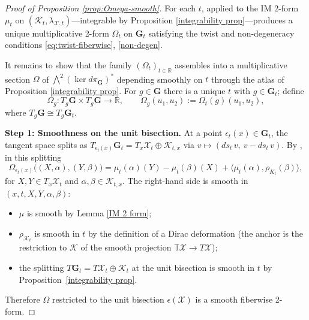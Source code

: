 \documentclass[reqno]{amsart}
\theoremstyle{plain}
\theoremstyle{definition}
\newcommand{\X}{\mathcal{X}}
\newcommand{\K}{\mathcal{K}}
\begin{document}
\begin{proof}[Proof of Proposition \ref{prop:Omega-smooth}]
For each $t$, \cite{bursztyn2004integration} applied to the IM 2-form $\mu_t$ on $(\K_t, \lambda_{\X,t})$---integrable by
Proposition \ref{integrability prop}---produces a unique multiplicative 2-form $\Omega_t$ on $\mathbf{G}_t$ satisfying the twist and non-degeneracy conditions \eqref{eq:twist-fiberwise}, \eqref{non-degen}.

It remains to show that the family $(\Omega_t)_{t \in \mathbb{R}}$ assembles into a multiplicative section $\Omega$ of $\bigwedge^2 (\ker d\pi_{\mathbf{G}})^*$ depending smoothly on $t$ through the atlas of Proposition \ref{integrability prop}. For $g \in \mathbf{G}$ there is a unique $t$ with $g \in \mathbf{G}_t$; define
\[
  \Omega_g : T_g\mathbf{G} \times T_g\mathbf{G} \longrightarrow \mathbb{R},
  \qquad \Omega_g(u_1, u_2) := \Omega_t(g)(u_1, u_2),
\]
where $T_g\mathbf{G} \cong T_g\mathbf{G}_t$.

\medskip
\noindent\textbf{Step 1: Smoothness on the unit bisection.}
At a point $\epsilon_t(x) \in \mathbf{G}_t$, the tangent space splits as $T_{\epsilon_t(x)}\mathbf{G}_t = T_x \X_t \oplus \K_{t,x}$ via
$v \mapsto (ds_t\, v,\ v - ds_t\, v)$. By \cite[Eq. (3.14)]{bursztyn2004integration}, in this splitting
\begin{equation}
  \Omega_{\epsilon_t(x)}\bigl((X,\alpha),(Y,\beta)\bigr)
  = \mu_t(\alpha)(Y) - \mu_t(\beta)(X) + \langle \mu_t(\alpha), \rho_{K_t}(\beta) \rangle,
\end{equation}
for $X, Y \in T_x \X_t$ and $\alpha, \beta \in \K_{t,x}$. The right-hand side is
smooth in $(x, t, X, Y, \alpha, \beta)$:
\begin{itemize}
  \item $\mu$ is smooth by Lemma \ref{IM 2 form};
  \item $\rho_{\K_t}$ is smooth in $t$ by the definition of a Dirac deformation (the anchor is the restriction to $\K$ of the smooth projection $\mathbb{T}\X \to T\X$);
  \item the splitting $T\mathbf{G}_t = T\X_t \oplus \K_t$ at the unit bisection is smooth in $t$ by Proposition~\ref{integrability prop}.
\end{itemize}
Therefore $\Omega$ restricted to the unit bisection $\epsilon(\mathcal{X})$ is a
smooth fiberwise 2-form.


\end{proof}
\end{document}
